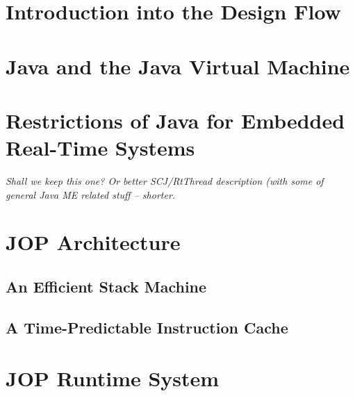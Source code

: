 


\chapter{Introduction into the Design Flow}
\label{chap:build}


\chapter{Java and the Java Virtual Machine}
\label{chap:java}


\chapter{Restrictions of Java for Embedded Real-Time Systems}
\emph{Shall we keep this one? Or better SCJ/RtThread description
(with some of general Java ME related stuff -- shorter.}

\label{chap:rtjava}
    

\chapter{JOP Architecture}
\label{chap:arch}

    
    
    

\clearpage
    \section{An Efficient Stack Machine}
    \label{sec:stack}
    

\clearpage
    
\clearpage
    

\clearpage
    \section{A Time-Predictable Instruction Cache}
    \label{sec:cache}
    

\chapter{JOP Runtime System}
\label{chap:runtime}

    
    
    
    
    
    

